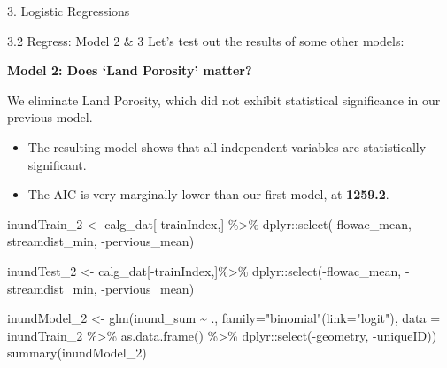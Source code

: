 \documentclass[
  ignorenonframetext,
]{beamer}
\newenvironment{Shaded}{\begin{snugshade}}{\end{snugshade}}
\newcommand{\AttributeTok}[1]{\textcolor[rgb]{0.77,0.63,0.00}{#1}}
\newcommand{\FunctionTok}[1]{\textcolor[rgb]{0.00,0.00,0.00}{#1}}
\newcommand{\NormalTok}[1]{#1}
\newcommand{\OtherTok}[1]{\textcolor[rgb]{0.56,0.35,0.01}{#1}}
\newcommand{\SpecialCharTok}[1]{\textcolor[rgb]{0.00,0.00,0.00}{#1}}
\newcommand{\StringTok}[1]{\textcolor[rgb]{0.31,0.60,0.02}{#1}}
\begin{document}
\begin{frame}[fragile]{3. Logistic Regressions}
\begin{block}{3.2 Regress: Model 2 \& 3}
\protect\hypertarget{regress-model-2-3}{}
Let's test out the results of some other models:

\textbf{Model 2: Does `Land Porosity' matter?}

We eliminate Land Porosity, which did not exhibit statistical
significance in our previous model.

\begin{itemize}
\item
  The resulting model shows that all independent variables are
  statistically significant.
\item
  The AIC is very marginally lower than our first model, at
  \textbf{1259.2}.
\end{itemize}

\begin{Shaded}
\begin{Highlighting}[]
\NormalTok{inundTrain\_2 }\OtherTok{\textless{}{-}}\NormalTok{ calg\_dat[ trainIndex,] }\SpecialCharTok{\%\textgreater{}\%} 
\NormalTok{  dplyr}\SpecialCharTok{::}\FunctionTok{select}\NormalTok{(}\SpecialCharTok{{-}}\NormalTok{flowac\_mean, }\SpecialCharTok{{-}}\NormalTok{streamdist\_min, }\SpecialCharTok{{-}}\NormalTok{pervious\_mean)}

\NormalTok{inundTest\_2  }\OtherTok{\textless{}{-}}\NormalTok{ calg\_dat[}\SpecialCharTok{{-}}\NormalTok{trainIndex,]}\SpecialCharTok{\%\textgreater{}\%} 
\NormalTok{  dplyr}\SpecialCharTok{::}\FunctionTok{select}\NormalTok{(}\SpecialCharTok{{-}}\NormalTok{flowac\_mean, }\SpecialCharTok{{-}}\NormalTok{streamdist\_min, }\SpecialCharTok{{-}}\NormalTok{pervious\_mean)}


\NormalTok{inundModel\_2 }\OtherTok{\textless{}{-}} \FunctionTok{glm}\NormalTok{(inund\_sum }\SpecialCharTok{\textasciitilde{}}\NormalTok{ ., }
                    \AttributeTok{family=}\StringTok{"binomial"}\NormalTok{(}\AttributeTok{link=}\StringTok{"logit"}\NormalTok{), }\AttributeTok{data =}\NormalTok{ inundTrain\_2 }\SpecialCharTok{\%\textgreater{}\%}
                                                            \FunctionTok{as.data.frame}\NormalTok{() }\SpecialCharTok{\%\textgreater{}\%}
\NormalTok{                                                            dplyr}\SpecialCharTok{::}\FunctionTok{select}\NormalTok{(}\SpecialCharTok{{-}}\NormalTok{geometry, }\SpecialCharTok{{-}}\NormalTok{uniqueID))}
\FunctionTok{summary}\NormalTok{(inundModel\_2)}
\end{Highlighting}
\end{Shaded}


\end{block}
\end{frame}
\end{document}
